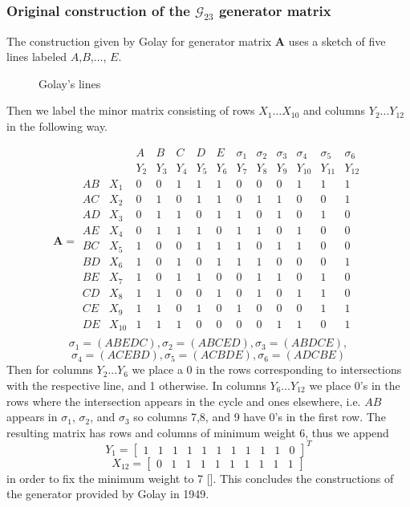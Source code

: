 \documentclass[paper=a4, fontsize=11pt]{scrartcl} %
\numberwithin{equation}{section} %
\numberwithin{figure}{section} %
\numberwithin{table}{section} %
\theoremstyle{break}
\begin{document}
\subsubsection{Original construction of the $\mathcal{G}_{23}$ generator matrix}
The construction given by Golay for generator matrix $\textbf{A}$ uses a sketch of five lines labeled $A$,$B$,$\ldots$, $E$.

\begin{figure}[!ht]
  \centering
  \def\svgwidth{150pt}
    
  \caption{Golay's lines}
  \label{fig:cstori}
\end{figure}

Then we label the minor matrix consisting of rows $X_1 \ldots X_{10}$ and columns $Y_2 \ldots Y_{12}$ in the following way.

$$\textbf{A} = \begin{array}{ccccccccccccc}
&&       A  &  B  &  C  &  D  &  E &\sigma_1&\sigma_2&\sigma_3&\sigma_4&\sigma_5&\sigma_6\\
&&      Y_2 & Y_3 & Y_4 & Y_5 & Y_6 & Y_7 & Y_8 & Y_9 & Y_{10} & Y_{11} & Y_{12} \\
AB &    X_1 & 0 & 0 & 1 & 1 & 1 & 0 & 0 & 0 & 1 & 1 & 1\\
AC &    X_2 & 0 & 1 & 0 & 1 & 1 & 0 & 1 & 1 & 0 & 0 & 1\\
AD &    X_3 & 0 & 1 & 1 & 0 & 1 & 1 & 0 & 1 & 0 & 1 & 0\\
AE &    X_4 & 0 & 1 & 1 & 1 & 0 & 1 & 1 & 0 & 1 & 0 & 0\\
BC &    X_5 & 1 & 0 & 0 & 1 & 1 & 1 & 0 & 1 & 1 & 0 & 0\\
BD &    X_6 & 1 & 0 & 1 & 0 & 1 & 1 & 1 & 0 & 0 & 0 & 1\\
BE &    X_7 & 1 & 0 & 1 & 1 & 0 & 0 & 1 & 1 & 0 & 1 & 0\\
CD &    X_8 & 1 & 1 & 0 & 0 & 1 & 0 & 1 & 0 & 1 & 1 & 0\\
CE &    X_9 & 1 & 1 & 0 & 1 & 0 & 1 & 0 & 0 & 0 & 1 & 1\\
DE & X_{10} & 1 & 1 & 1 & 0 & 0 & 0 & 0 & 1 & 1 & 0 & 1\\
\end{array}$$
$$\sigma_1=(ABEDC), \sigma_2=(ABCED), \sigma_3=(ABDCE),$$
$$\sigma_4=(ACEBD), \sigma_5=(ACBDE), \sigma_6=(ADCBE)$$
Then for columns $Y_2 \ldots Y_6$ we place a 0 in the rows corresponding to intersections with the respective line, and 1 otherwise. In columns $Y_6 \ldots Y_{12}$ we place 0's in the rows where the intersection appears in the cycle and ones elsewhere, i.e. $AB$ appears in $\sigma_1$, $\sigma_2$, and $\sigma_3$ so columns 7,8, and 9 have 0's in the first row. The resulting matrix has rows and columns of minimum weight 6, thus we append 
$$Y_1 = [ \begin{array}{ccccccccccc} 1& 1& 1& 1& 1& 1& 1& 1& 1& 1& 0\end{array}]^T$$
$$X_{12} = [\begin{array}{cccccccccccc} 0& 1& 1& 1& 1& 1& 1& 1& 1& 1\end{array}]$$
in order to fix the minimum weight to 7 [\cite{thompson}]. This concludes the constructions of the generator provided by Golay in 1949.
\end{document}

